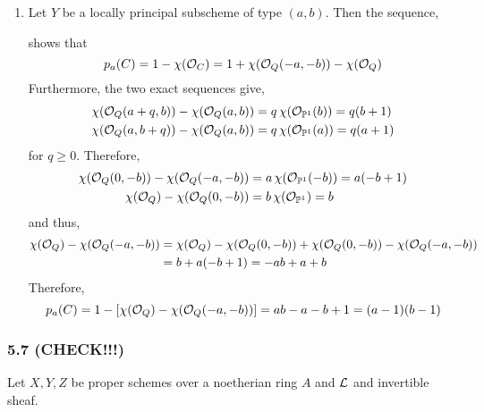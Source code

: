 \documentclass[12pt]{article}
\begin{document}
\begin{enumerate}
\item Let $Y$ be a locally principal subscheme of type $(a,b)$. Then the sequence,
\begin{center}
\end{center} 
shows that
\[ p_a(C) = 1 - \chi(\mathcal{O}_{C}) = 1 + \chi(\mathcal{O}_{Q}(-a,-b)) - \chi(\mathcal{O}_{Q}) \] 
Furthermore, the two exact sequences give,
\begin{align*}
\chi(\mathcal{O}_{Q}(a+q,b)) - \chi(\mathcal{O}_{Q}(a,b)) & = q \, \chi(\mathcal{O}_{\mathbb{P}^1}(b)) = q (b+1) 
\\
\chi(\mathcal{O}_{Q}(a,b+q)) - \chi(\mathcal{O}_{Q}(a,b)) & = q \, \chi(\mathcal{O}_{\mathbb{P}^1}(a)) = q (a+1) 
\end{align*}
for $q \ge 0$. Therefore,
\begin{align*}
\chi(\mathcal{O}_{Q}(0,-b)) - \chi(\mathcal{O}_{Q}(-a,-b)) & = a \, \chi(\mathcal{O}_{\mathbb{P}^1}(-b)) = a (-b+1) 
\\
\chi(\mathcal{O}_{Q}) - \chi(\mathcal{O}_{Q}(0,-b)) & = b \, \chi(\mathcal{O}_{\mathbb{P}^1}) = b 
\end{align*}
and thus,
\begin{align*}
\chi(\mathcal{O}_{Q}) - \chi(\mathcal{O}_{Q}(-a,-b)) & = \chi(\mathcal{O}_{Q}) - \chi(\mathcal{O}_{Q}(0,-b)) + \chi(\mathcal{O}_{Q}(0,-b)) - \chi(\mathcal{O}_{Q}(-a,-b))
\\
& = b + a(-b+1) = -ab + a + b
\end{align*}
Therefore,
\[ p_a(C) = 1 - [\chi(\mathcal{O}_{Q}) - \chi(\mathcal{O}_{Q}(-a,-b))] = ab - a - b + 1 = (a - 1)(b - 1) \]
\end{enumerate}

\subsubsection{5.7 (CHECK!!!)}

Let $X, Y, Z$ be proper schemes over a noetherian ring $A$ and $\mathcal{L}$ and invertible sheaf.
\end{document}
